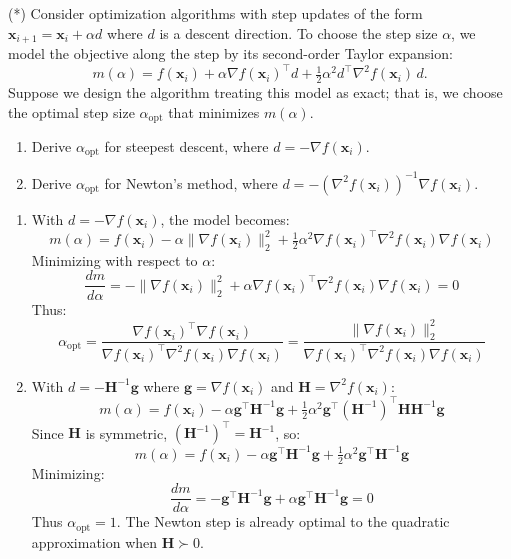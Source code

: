 \begin{exercise} %
    (*) Consider optimization algorithms with step updates of the form $\mathbf{x}_{i+1} = \mathbf{x}_i + \alpha d$ where $d$ is a descent direction. To choose the step size $\alpha$, we model the objective along the step by its second-order Taylor expansion:
    \[
        m(\alpha) = f(\mathbf{x}_i) + \alpha \nabla f(\mathbf{x}_i)^\top d + \tfrac{1}{2}\alpha^2 d^\top \nabla^2 f(\mathbf{x}_i)\, d.
    \]
    Suppose we design the algorithm treating this model as exact; that is, we choose the optimal step size $\alpha_{\text{opt}}$ that minimizes $m(\alpha)$.
    \begin{enumerate}[label=(\alph*)]
        \item Derive $\alpha_{\text{opt}}$ for steepest descent, where $d = -\nabla f(\mathbf{x}_i)$.
        \item Derive $\alpha_{\text{opt}}$ for Newton's method, where $d = -(\nabla^2 f(\mathbf{x}_i))^{-1}\nabla f(\mathbf{x}_i)$.
    \end{enumerate}
\end{exercise}

\begin{solution}
    \begin{enumerate}[label=(\alph*)]
        \item With $d = -\nabla f(\mathbf{x}_i)$, the model becomes:
        \[
            m(\alpha) = f(\mathbf{x}_i) - \alpha \|\nabla f(\mathbf{x}_i)\|_2^2 + \tfrac{1}{2}\alpha^2 \nabla f(\mathbf{x}_i)^\top \nabla^2 f(\mathbf{x}_i) \nabla f(\mathbf{x}_i)
        \]
        Minimizing with respect to $\alpha$:
        \[
            \frac{dm}{d\alpha} = -\|\nabla f(\mathbf{x}_i)\|_2^2 + \alpha \nabla f(\mathbf{x}_i)^\top \nabla^2 f(\mathbf{x}_i) \nabla f(\mathbf{x}_i) = 0
        \]
        Thus:
        \[
            \alpha_{\text{opt}} = \frac{\nabla f(\mathbf{x}_i)^\top \nabla f(\mathbf{x}_i)}{\nabla f(\mathbf{x}_i)^\top \nabla^2 f(\mathbf{x}_i) \nabla f(\mathbf{x}_i)} = \frac{\|\nabla f(\mathbf{x}_i)\|_2^2}{\nabla f(\mathbf{x}_i)^\top \nabla^2 f(\mathbf{x}_i) \nabla f(\mathbf{x}_i)}
        \]
        
        \item With $d = -\mathbf{H}^{-1}\mathbf{g}$ where $\mathbf{g} = \nabla f(\mathbf{x}_i)$ and $\mathbf{H} = \nabla^2 f(\mathbf{x}_i)$:
        \[
            m(\alpha) = f(\mathbf{x}_i) - \alpha \mathbf{g}^\top \mathbf{H}^{-1}\mathbf{g} + \tfrac{1}{2}\alpha^2 \mathbf{g}^\top (\mathbf{H}^{-1})^\top \mathbf{H} \mathbf{H}^{-1} \mathbf{g}
        \]
        Since $\mathbf{H}$ is symmetric, $(\mathbf{H}^{-1})^\top = \mathbf{H}^{-1}$, so:
        \[
            m(\alpha) = f(\mathbf{x}_i) - \alpha \mathbf{g}^\top \mathbf{H}^{-1}\mathbf{g} + \tfrac{1}{2}\alpha^2 \mathbf{g}^\top \mathbf{H}^{-1}\mathbf{g}
        \]
        Minimizing:
        \[
            \frac{dm}{d\alpha} = -\mathbf{g}^\top \mathbf{H}^{-1}\mathbf{g} + \alpha \mathbf{g}^\top \mathbf{H}^{-1}\mathbf{g} = 0
        \]
        Thus $\alpha_{\text{opt}} = 1$. The Newton step is already optimal to the quadratic approximation when $\mathbf{H} \succ 0$.
    \end{enumerate}
\end{solution}

